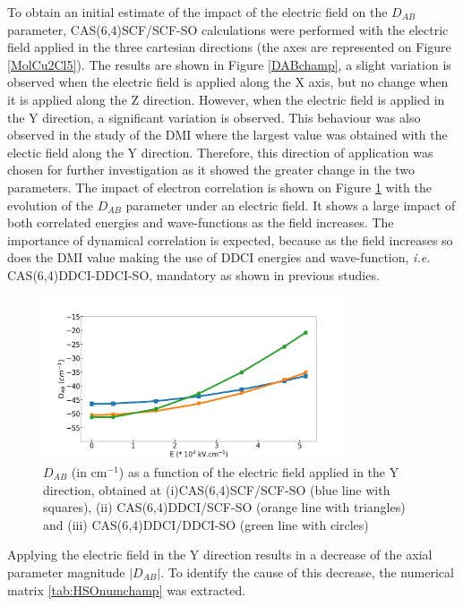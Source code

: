 \documentclass[12pt]{report}
\numberwithin{equation}{section}
\begin{document}
To obtain an initial estimate of the impact of the electric field on the $D_{AB}$ parameter, CAS(6,4)SCF/SCF-SO calculations were performed with the electric field applied in the three cartesian directions (the axes are represented on Figure \ref{MolCu2Cl5}).
The results are shown in Figure \ref{DABchamp}, a slight variation is observed when the electric field is applied along the X axis, but no change when it is applied along the Z direction.
However, when the electric field is applied in the Y direction, a significant variation is observed.
This behaviour was also observed in the study of the DMI where the largest value was obtained with the electic field along the Y direction.
Therefore, this direction of application was chosen for further investigation as it showed the greater change in the two parameters.
The impact of electron correlation is shown on Figure \ref{DABcorrelation} with the evolution of the $D_{AB}$ parameter under an electric field. 
It shows a large impact of both correlated energies and wave-functions as the field increases.
The importance of dynamical correlation is expected, because as the field increases so does the DMI value making the use of DDCI energies and wave-function, \textit{i.e.} CAS(6,4)DDCI-DDCI-SO, mandatory as shown in previous studies.

\begin{figure}[!ht]
    \centering
    \includegraphics[width=0.8\textwidth]{Images/DABcorrelation.png}
    \caption[$D_{AB}$ (in cm$^{-1}$) as a function of the electric field applied in the Y direction, obtained at three levels of calculation.]{$D_{AB}$ (in cm$^{-1}$) as a function of the electric field applied in the Y direction, obtained at (i)CAS(6,4)SCF/SCF-SO (blue line with squares), (ii) CAS(6,4)DDCI/SCF-SO (orange line with triangles) and (iii) CAS(6,4)DDCI/DDCI-SO (green line with circles)}
    \label{DABcorrelation}
\end{figure}

Applying the electric field in the Y direction results in a decrease of the axial parameter magnitude $|D_{AB}|$.
To identify the cause of this decrease, the numerical matrix \ref{tab:HSOnumchamp} was extracted.
\end{document}
